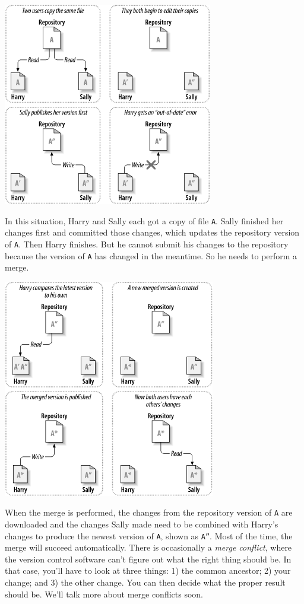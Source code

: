 \begin{center}
	\includegraphics[width=.5\textwidth]{images/ch02dia4.png}
	~\cite{svnbook}
\end{center}

In this situation, Harry and Sally each got a copy of file \texttt{A}. Sally finished her changes first and committed those changes, which updates the repository version of \texttt{A}. Then Harry finishes. But he cannot submit his changes to the repository because the version of \texttt{A} has changed in the meantime. So he needs to perform a merge.

\begin{center}
	\includegraphics[width=.5\textwidth]{images/ch02dia5.png}
	~\cite{svnbook}
\end{center}

When the merge is performed, the changes from the repository version of \texttt{A} are downloaded and the changes Sally made need to be combined with Harry's changes to produce the newest version of \texttt{A}, shown as \texttt{A''}. Most of the time, the merge will succeed automatically. There is occasionally a \emph{merge conflict}, where the version
control software can't figure out what the right thing should be.  In
that case, you'll have to look at three things: 1) the common
ancestor; 2) your change; and 3) the other change. You can then decide
what the proper result should be. We'll talk more about merge conflicts soon.

